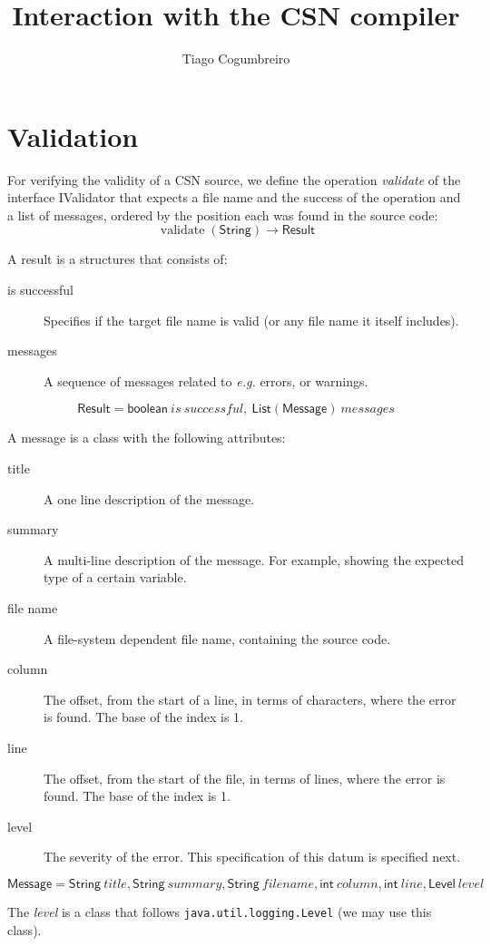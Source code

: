 \documentclass[a4paper]{article}
\title{Interaction with the CSN compiler}
\author{Tiago Cogumbreiro}
\begin{document}
\maketitle

\section{Validation}

For verifying the validity of a CSN source, we define the operation
\emph{validate} of the interface \textsf{IValidator} that expects a
file name and the success of the operation and a list of messages,
ordered by the position each was found in the source code:
\begin{equation*}
  \operatorname{validate}(\mathsf{String}) \rightarrow \mathsf{Result}
\end{equation*}

A result is a structures that consists of:
\begin{description}
\item[is successful] Specifies if the target file name is valid (or any file
  name it itself includes).
\item[messages] A sequence of messages related to \textit{e.g.\@}
  errors, or warnings.
\end{description}
\begin{equation*}
  \mathsf{Result} = \mathsf{boolean}\ is\ successful,\ \mathsf{List(Message)}\ messages
\end{equation*}

A message is a class with the following attributes:
\begin{description}
\item[title] A one line description of the message.
\item[summary] A multi-line description of the message. For
  example, showing the expected type of a certain variable.
\item[file name] A file-system dependent file name, containing the
  source code.
\item[column] The offset, from the start of a line, in terms of
  characters, where the error is found. The base of the index is 1.
\item[line] The offset, from the start of the file, in terms of lines,
  where the error is found. The base of the index is 1.
\item[level] The severity of the error. This specification of this
  datum is specified next.
\end{description}
\begin{equation*}
  \mathsf{Message} = \mathsf{String}\ title, \mathsf{String}\ summary, \mathsf{String}\ filename, \mathsf{int}\ column, \mathsf{int}\ line, \mathsf{Level}\ level
\end{equation*}

The \emph{level} is a class that follows
\texttt{java.util.logging.Level} (we may use this class).
\end{document}
